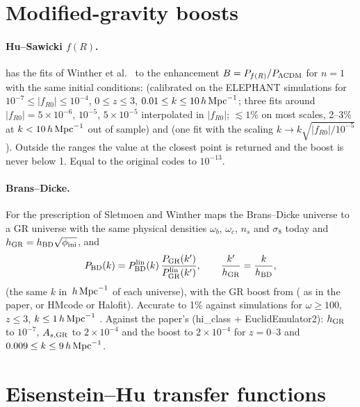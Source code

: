 \section{Modified-gravity boosts}\label{sec:fit-mg}

\paragraph*{Hu--Sawicki $f(R)$.}  has the fits of Winther et al.\ \cite{Winther2019} to the
enhancement $B=P_{f(R)}/P_{\Lambda\rm CDM}$ for $n=1$ with the same initial conditions: 
(calibrated on the ELEPHANT simulations for $10^{-7}\le|f_{R0}|\le10^{-4}$, $0\le z\le3$, $0.01\le k\le10\,h\,\mathrm{Mpc}^{-1}$; three fits
around $|f_{R0}|=5\times10^{-6}$, $10^{-5}$, $5\times10^{-5}$ interpolated in $|f_{R0}|$; $\lesssim1\%$ on most scales, 2--3\%
at $k<10\,h\,\mathrm{Mpc}^{-1}$ out of sample) and  (one fit with the scaling $k\to k\sqrt{|f_{R0}|/10^{-5}}$). Outside the
ranges the value at the closest point is returned and the boost is never below 1. Equal to the original codes to
$10^{-13}$.

\paragraph*{Brans--Dicke.} For  the prescription of Sletmoen and Winther \cite{Sletmoen2024} maps the
Brans--Dicke universe to a GR universe with the same physical densities $\omega_b$, $\omega_c$, $n_s$ and $\sigma_8$ today
and $h_{\rm GR}=h_{\rm BD}\sqrt{\phi_{\rm ini}}$, and
\begin{equation}
P_{\rm BD}(k)=P^{\rm lin}_{\rm BD}(k)\,\frac{P_{\rm GR}(k')}{P^{\rm lin}_{\rm GR}(k')},\qquad \frac{k'}{h_{\rm GR}}=\frac{k}{h_{\rm BD}},
\end{equation}
(the same $k$ in $\,h\,\mathrm{Mpc}^{-1}$ of each universe), with the GR boost from  ( as in the paper, or
HMcode or Halofit). Accurate to 1\% against simulations for $\omega\ge100$, $z\le3$, $k\le1\,h\,\mathrm{Mpc}^{-1}$ \cite{Sletmoen2024}.
Against the paper's  (hi\_class + EuclidEmulator2): $h_{\rm GR}$ to $10^{-7}$, $A_{s,\rm GR}$ to $2\times10^{-4}$
and the boost to $2\times10^{-4}$ for $z=0$--3 and $0.009\le k\le9\,h\,\mathrm{Mpc}^{-1}$.

\section{Eisenstein--Hu transfer functions}\label{sec:fit-eh}

